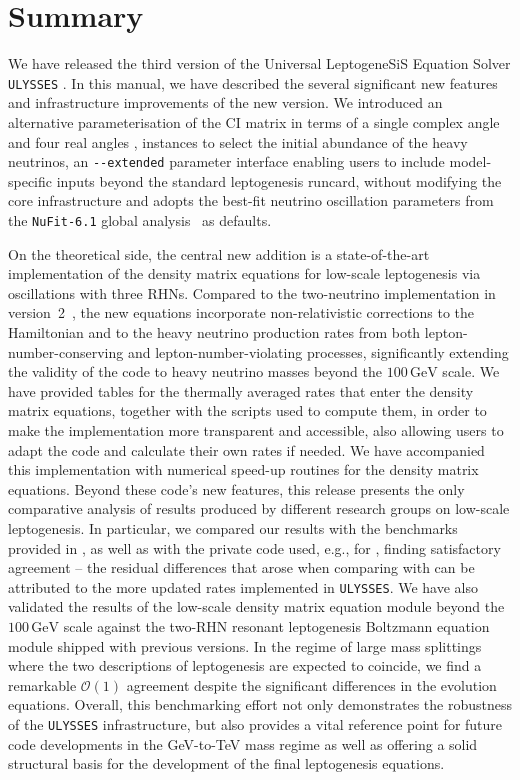 \documentclass[12pt, a4paper]{article}
\begin{document}
\section{Summary}\label{sec:conclusions}
We have released the third version of the Universal LeptogeneSiS Equation Solver
\texttt{ULYSSES} \href{https://github.com/earlyuniverse/ulysses}{\faGithub}. In this manual, we have described the several significant new features and
infrastructure improvements of the new version.
We introduced an alternative parameterisation
of the CI matrix in terms of a single complex angle and four real angles
\cite{Drewes:2021nqr},  instances to select the initial abundance of the heavy neutrinos, an \texttt{-{}-extended} parameter interface enabling users to include model-specific inputs beyond the standard leptogenesis runcard, without modifying the core infrastructure and adopts the best-fit neutrino oscillation parameters from the
\texttt{NuFit-6.1} global analysis~\cite{Esteban:2024eli} as defaults.

On the theoretical side, the central new addition is a state-of-the-art
implementation of the density matrix equations for low-scale leptogenesis via
oscillations with three RHNs. Compared to the two-neutrino
implementation in version~2~\cite{Granelli:2023vcm}, the new equations incorporate
non-relativistic corrections to the Hamiltonian and to the heavy neutrino production
rates from both lepton-number-conserving and lepton-number-violating processes,
significantly extending the validity of the code to heavy neutrino masses beyond the $100\,\text{GeV}$ scale. We have provided tables for the thermally averaged rates that enter the density matrix equations, together with the scripts used to compute them, in order to make the implementation more transparent and accessible, also allowing users to adapt the code and calculate their own rates if needed. We have accompanied
this implementation with numerical speed-up routines for the density matrix equations. Beyond these code’s new features, this release presents the only comparative analysis of results produced by different research groups on low-scale leptogenesis. In particular, we compared our results with the benchmarks provided in \cite{Abada:2018oly, Hernandez:2022ivz}, as well as with the private code used, e.g., for \cite{Drewes:2021nqr}, finding satisfactory agreement -- the residual differences that arose when comparing with \cite{Abada:2018oly}
can be attributed to the more updated rates implemented in \texttt{ULYSSES}. We have also validated the results of the low-scale density matrix equation module beyond the $100\, \text{GeV}$ scale against the two-RHN resonant leptogenesis Boltzmann equation module shipped with previous versions. In the regime of large mass splittings where the two descriptions of leptogenesis are expected to coincide, we find a remarkable $\mathcal{O}(1)$ agreement despite the significant differences in the evolution equations. Overall, this benchmarking effort not only  demonstrates 
the  robustness of the \texttt{ULYSSES} infrastructure, but also provides a vital reference point for future code developments in the GeV-to-TeV mass regime as well as offering a solid structural basis for the development of the final leptogenesis equations.
\end{document}

